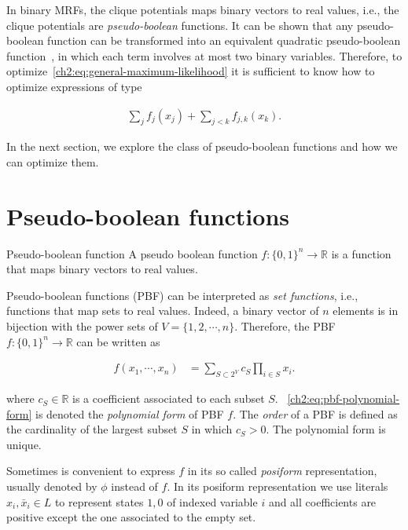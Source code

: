 In binary MRFs, the clique potentials maps binary vectors to real values, i.e., the clique potentials are \emph{pseudo-boolean} functions. It can be shown that any pseudo-boolean function can be transformed into an equivalent quadratic pseudo-boolean function~\cite{boros02pseudo}, in which each term involves at most two binary variables. Therefore, to optimize~\cref{ch2:eq:general-maximum-likelihood} it is sufficient to know how to optimize expressions of type

\begin{align*}
	\sum_{j}{f_j(x_j)} + \sum_{j<k}{f_{j,k}(x_k)}.
\end{align*} 

In the next section, we explore the class of pseudo-boolean functions and how we can optimize them.


\section{Pseudo-boolean functions}

\begin{definition}{Pseudo-boolean function}
	A pseudo boolean function $f:\{0,1\}^n \rightarrow \mathbb{R}$ is a function that maps binary vectors to real values.
\end{definition}

Pseudo-boolean functions (PBF) can be interpreted as \emph{set functions}, i.e., functions that map sets to real values. Indeed, a binary vector of $n$ elements is in bijection with the power sets of $V = \{1,2,\cdots,n\}$. Therefore, the PBF $f:\{0,1\}^n \rightarrow \mathbb{R}$ can be written as

\begin{align}
	f(x_1,\cdots,x_n) &= \sum_{S \subset 2^{V}}{c_S \prod_{i \in S}{x_i}}.
	\label{ch2:eq:pbf-polynomial-form}
\end{align}

where $c_S \in \mathbb{R}$ is a coefficient associated to each subset $S$. ~\cref{ch2:eq:pbf-polynomial-form} is denoted the \emph{polynomial form} of PBF $f$. The \emph{order} of a PBF is defined as the cardinality of the largest subset $S$ in which $c_S>0$. The polynomial form is unique. 

Sometimes is convenient to express $f$ in its so called \emph{posiform} representation, usually denoted by $\phi$ instead of $f$. In its posiform representation we use literals $x_i,\bar{x}_i \in L$  to represent states $1,0$ of indexed variable $i$ and all coefficients are positive except the one associated to the empty set.

